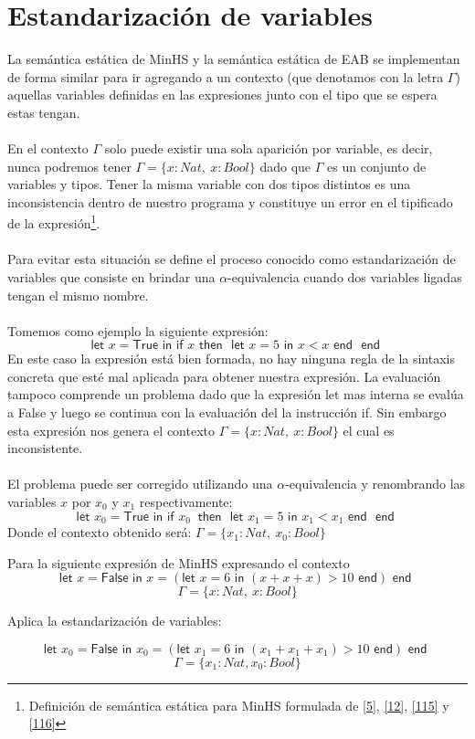 \section{Estandarización de variables}
La semántica estática de \textsf{MinHS} y la semántica estática de \textsf{EAB} se implementan de forma similar para ir agregando a un contexto (que denotamos con la letra $\Gamma$) aquellas variables definidas en las expresiones junto con el tipo que se espera estas tengan.\\\\
En el contexto $\Gamma$ solo puede existir una sola aparición por variable, es decir, nunca podremos tener $\Gamma=\{x : Nat,\ x : Bool\}$ dado que $\Gamma$ es un conjunto de variables y tipos. Tener la misma variable con dos tipos distintos es una inconsistencia dentro de nuestro programa y constituye un error en el tipificado de la expresión\footnote{Definición de semántica estática para \textsf{MinHS} formulada de  \hyperlink{5}{[5]},  \hyperlink{12}{[12]}, \hyperlink{115}{[115]} y \hyperlink{116}{[116]}}.\\\\
Para evitar esta situación se define el proceso conocido como estandarización de variables que consiste en brindar una $\alpha$-equivalencia cuando dos variables ligadas tengan el mismo nombre.\\\\
Tomemos como ejemplo la siguiente expresión:
$$ \textsf{let } x = \textsf{True} \textsf{ in } \textsf{if } x \textsf{ then } \textsf{ let } x = 5 \textsf{ in } x < x \textsf{ end } \textsf{ end }$$
En este caso la expresión está bien formada, no hay ninguna regla de la sintaxis concreta que esté mal aplicada para obtener nuestra expresión. La evaluación tampoco comprende un problema dado que la expresión \textsf{let} mas interna se evalúa a \textsf{False} y luego se continua con la evaluación del la instrucción \textsf{if}. Sin embargo esta expresión nos genera el contexto $\Gamma=\{x : Nat,\ x : Bool\}$ el cual es inconsistente.\\\\
El problema puede ser corregido utilizando una $\alpha$-equivalencia y renombrando las variables $x$ por $x_0$ y $x_1$ respectivamente:
$$ \textsf{let } x_0 = \textsf{True} \textsf{ in } \textsf{if } x_0\ \textsf{ then } \textsf{ let } x_1 = 5 \textsf{ in } x_1 < x_1 \textsf{ end } \textsf{ end }$$
Donde el contexto obtenido será: $\Gamma=\{x_1 : Nat,\ x_0 : Bool\}$

\begin{exercise}
    Para la siguiente expresión de \textsf{MinHS} expresando el contexto
    $$\textsf{let } x = \textsf{False} \textsf{ in } x = (\textsf{let } x = 6 \textsf{ in } (x + x + x) > 10 \textsf{ end}) \textsf{ end }$$
    $$\Gamma=\{x : Nat,\ x : Bool\}$$
    
    Aplica la estandarización de variables:
    
    $$\textsf{let } x_0 = \textsf{False} \textsf{ in } x_0 = (\textsf{let } x_1 = 6 \textsf{ in } (x_1 + x_1 + x_1) > 10 \textsf{ end}) \textsf{ end }$$
    $$\Gamma=\{x_1 : Nat, x_0 : Bool\}$$

\end{exercise} 

